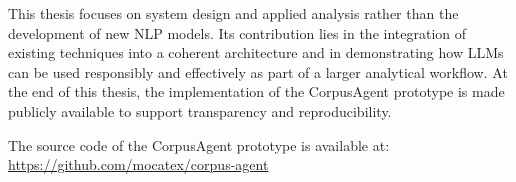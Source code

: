 This thesis focuses on system design and applied analysis rather than the development of new NLP models. Its contribution lies in the integration of existing techniques into a coherent architecture and in demonstrating how LLMs can be used responsibly and effectively as part of a larger analytical workflow.
At the end of this thesis, the implementation of the CorpusAgent prototype is made publicly available to support transparency and reproducibility.

The source code of the CorpusAgent prototype is available at:
\url{https://github.com/mocatex/corpus-agent}
